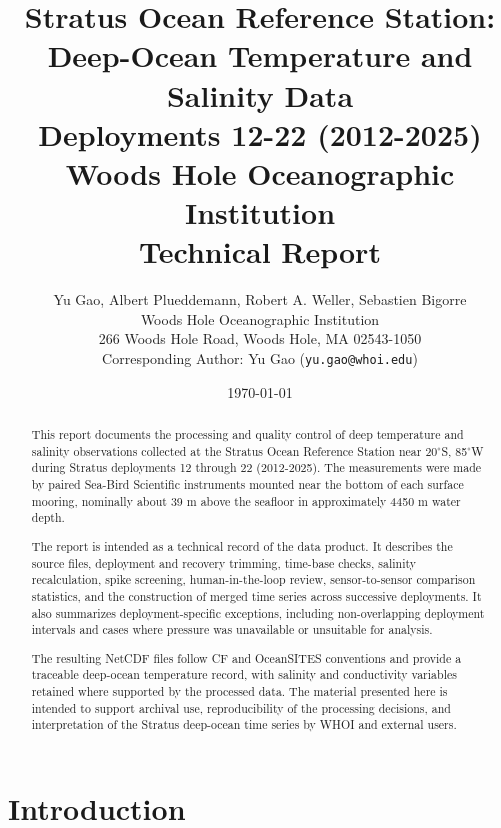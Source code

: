 \documentclass[12pt]{report}
\title{
    \textbf{Stratus Ocean Reference Station:\\
    Deep-Ocean Temperature and Salinity Data\\
    Deployments 12-22 (2012-2025)}\\
    \vspace{1cm}
    \large Woods Hole Oceanographic Institution\\
    Technical Report
}
\author{
    Yu Gao, Albert Plueddemann, Robert A. Weller, Sebastien Bigorre\\
    Woods Hole Oceanographic Institution\\
    266 Woods Hole Road, Woods Hole, MA 02543-1050\\
    Corresponding Author: Yu Gao (\texttt{yu.gao@whoi.edu})
}
\date{\today}
\begin{document}
\maketitle

\begin{abstract}
This report documents the processing and quality control of deep temperature and salinity observations collected at the Stratus Ocean Reference Station near 20$^{\circ}$S, 85$^{\circ}$W during Stratus deployments 12 through 22 (2012-2025). The measurements were made by paired Sea-Bird Scientific instruments mounted near the bottom of each surface mooring, nominally about 39 m above the seafloor in approximately 4450 m water depth.

The report is intended as a technical record of the data product. It describes the source files, deployment and recovery trimming, time-base checks, salinity recalculation, spike screening, human-in-the-loop review, sensor-to-sensor comparison statistics, and the construction of merged time series across successive deployments. It also summarizes deployment-specific exceptions, including non-overlapping deployment intervals and cases where pressure was unavailable or unsuitable for analysis.

The resulting NetCDF files follow CF and OceanSITES conventions and provide a traceable deep-ocean temperature record, with salinity and conductivity variables retained where supported by the processed data. The material presented here is intended to support archival use, reproducibility of the processing decisions, and interpretation of the Stratus deep-ocean time series by WHOI and external users.
\end{abstract}

\setcounter{tocdepth}{1}


\tableofcontents

\chapter{Introduction}


\end{document}
